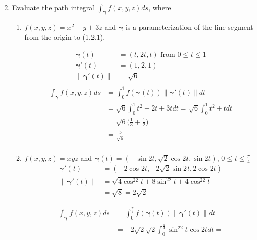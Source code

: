 \documentclass{article}
\newcommand{\norm}[1]{\| #1 \|}
\begin{document}
\begin{enumerate}
\begin{enumerate}
\begin{multicols}{2}
\begin{align*}
    \end{align*}
    \end{multicols}
\end{enumerate}
\newpage
\item Evaluate the path integral $\displaystyle \int_{\boldsymbol{\gamma}}f(x,y,z)ds$, where
\begin{enumerate}
    \item $f(x,y,z) = x^2 - y + 3z$ and $\boldsymbol{\gamma}$ is a parameterization of the line segment from the origin to (1,2,1).
    \begin{multicols}{2} 
    \noindent
    \begin{align*} 
        \boldsymbol{\gamma}(t) &= (t,2t,t) \text{ from } 0 \leq t \leq 1 \\
        \boldsymbol{\gamma}'(t) &= (1, 2, 1) \\
        \norm{\boldsymbol{\gamma}'(t)} &= \sqrt{6} \\
    \end{align*}
    \begin{align*} 
        \int_{\boldsymbol{\gamma}}f(x,y,z)ds &= \int_0^1 f(\boldsymbol{\gamma}(t)) \norm{\boldsymbol{\gamma}'(t)}dt \\
        &= \sqrt{6} \int_0^1 t^2 - 2t + 3 t dt = \sqrt{6} \int_0^1 t^2 + t dt \\
        &= \sqrt{6} \Big(\frac{1}{3} + \frac{1}{2}\Big) \\
        &= \frac{5}{\sqrt{6}} \\
    \end{align*}
    \end{multicols}
    \item $f(x,y,z) = xyz$ and $\boldsymbol{\gamma}(t) = (-\sin 2t, \sqrt{2} \cos 2t, \sin 2t)$, $\displaystyle 0 \leq t \leq \frac{\pi}{4}$
    \begin{align*} 
        \boldsymbol{\gamma}'(t) &= (-2\cos 2t, -2\sqrt2\sin 2t, 2\cos 2t) \\
        \norm{\boldsymbol{\gamma}'(t)} &= \sqrt{4\cos^22t+8\sin^22t+4\cos^22t} \\
        &= \sqrt{8} = 2\sqrt{2}
    \end{align*}
    \begin{multicols}{2} 
    \noindent
    \begin{align*} 
        \int_{\boldsymbol{\gamma}}f(x,y,z)ds &= \int_0^{\frac{\pi}{4}} f(\boldsymbol{\gamma}(t)) \norm{\boldsymbol{\gamma}'(t)}dt \\
        &= -2\sqrt{2}\sqrt{2} \int_0^{\frac{\pi}{4}} \sin^22t \cos 2t dt = \\

\end{align*}
\end{multicols}
\end{enumerate}
\end{enumerate}
\end{document}

